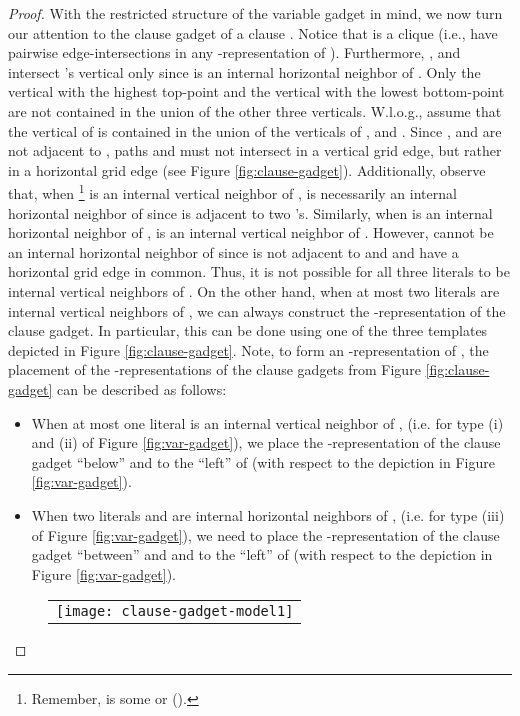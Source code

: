 \documentclass[11pt,3p,times]{elsarticle}
\newenvironment{myproof}{\begin{proof}}{\end{proof}}
\begin{document}
\begin{myproof}
With the restricted structure of the variable gadget in mind, we
now turn our attention to the clause gadget of a clause . Notice that  is
a clique (i.e.,  have pairwise edge-intersections
in any -representation of ).
Furthermore, ,  and  intersect
's vertical only since  is an internal horizontal
neighbor of . Only the vertical with the highest top-point
and the vertical with the lowest bottom-point are not contained
in the union of the other three verticals.  W.l.o.g., assume that the
vertical of  is contained in the union of the verticals of
,  and . Since , 
and  are not adjacent to , paths  and
 must not intersect in a vertical grid edge, but rather in a
horizontal grid edge (see Figure \ref{fig:clause-gadget}).
Additionally, observe that, when
\footnote{Remember,  is some  or
 ().} is an internal vertical
neighbor of ,  is necessarily an internal horizontal
neighbor of  since  is adjacent to two 's.
Similarly, when  is an internal horizontal neighbor of
,  is an internal vertical neighbor of . However,
 cannot be an internal horizontal neighbor of  since
 is not adjacent to  and  and  have
a horizontal grid edge in common. Thus, it is not possible for all
three literals to be internal vertical neighbors of . On the
other hand, when at most two literals are internal vertical
neighbors of , we can always construct the
-representation of the clause gadget. In particular, this
can be done using one of the three templates depicted in Figure
\ref{fig:clause-gadget}. Note, to form an -representation
of , the placement of the -representations of the
clause gadgets from Figure \ref{fig:clause-gadget} can be described as
follows:
\begin{itemize}
\item When at most one literal is an
internal vertical neighbor of , (i.e. for type (i) and (ii) of
Figure \ref{fig:var-gadget}), we place the
-representation of the clause gadget ``below''
 and to the ``left'' of  (with
respect to the depiction in Figure \ref{fig:var-gadget}).
\item When two literals  and  are
internal horizontal neighbors of , (i.e. for type (iii)
of Figure \ref{fig:var-gadget}), we need to place the
-representation of the clause gadget ``between''
 and  and to the ``left'' of
 (with respect to the depiction in Figure
\ref{fig:var-gadget}).
\end{itemize}
\begin{figure}[h]
\begin{tabular}{c}
\texttt{[image: clause-gadget-model1]} \\

\end{tabular}
\end{figure}
\end{myproof}
\end{document}
